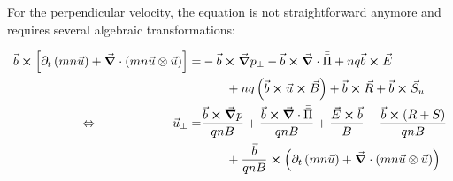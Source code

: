 For the perpendicular velocity, the equation is not straightforward anymore and requires several algebraic transformations:

\begin{align}
	\vec{b}\cross\left[\partial_t \left(mn\vec{u}\right) + \vec{\grad}\cdot\left(mn\vec{u}\otimes\vec{u}\right)\right] =& -\vec{b}\cross\vec{\grad} p_\perp - \vec{b}\cross\vec{\grad}\cdot\bar{\bar{\Pi}} + nq\vec{b}\cross\vec{E} \nonumber\\ & \qquad + nq\left(\vec{b}\cross\vec{u}\cross\vec{B}\right) + \vec{b}\cross\vec{R} + \vec{b}\cross\vec{S}_u \nonumber \\
	\Leftrightarrow\qquad \qquad \qquad
	\vec{u}_\perp =& \frac{\vec{b}\cross\vec{\grad} p}{qnB} + \frac{\vec{b}\cross\vec{\grad}\cdot\bar{\bar{\Pi}}}{qnB} +  \frac{\vec{E}\cross\vec{b}}{B} - \frac{\vec{b}\cross\left(R+S\right)}{qnB} \nonumber\\ & \qquad + \frac{\vec{b}}{qnB} \cross \left(\partial_t \left(mn\vec{u}\right) + \vec{\grad}\cdot\left(mn\vec{u}\otimes\vec{u}\right)\right)
\end{align}

